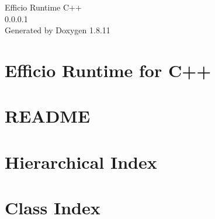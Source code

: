\documentclass[twoside]{book}
\newcommand{\+}{\discretionary{\mbox{\scriptsize$\hookleftarrow$}}{}{}}
\newcommand{\clearemptydoublepage}{%
  \newpage{\pagestyle{empty}\cleardoublepage}%
}
\begin{document}
\hypersetup{pageanchor=false,
             bookmarksnumbered=true,
             pdfencoding=unicode
            }
\begin{titlepage}
\vspace*{7cm}
\begin{center}%
{\Large Efficio Runtime C++ \\[1ex]\large 0.\+0.\+0.\+1 }\\
\vspace*{1cm}
{\large Generated by Doxygen 1.8.11}\\
\end{center}
\end{titlepage}
\clearemptydoublepage
\tableofcontents
\clearemptydoublepage
{}
\hypersetup{pageanchor=true}

\chapter{Efficio Runtime for C++}
\label{index}\hypertarget{index}{}
\chapter{R\+E\+A\+D\+ME}
\label{md_README}
\hypertarget{md_README}{}

\chapter{Hierarchical Index}

\chapter{Class Index}

\end{document}
